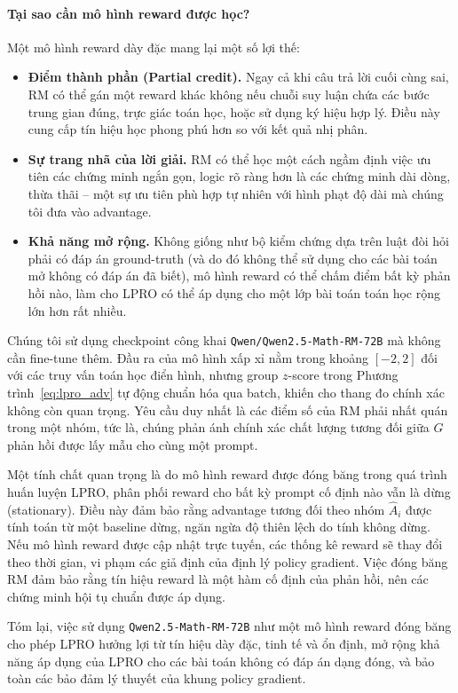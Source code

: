 \documentclass[11pt,a4paper]{article}
\begin{document}
\paragraph{Tại sao cần mô hình reward được học?}
Một mô hình reward dày đặc mang lại một số lợi thế:
\begin{itemize}[leftmargin=*]
  \item \textbf{Điểm thành phần (Partial credit).} Ngay cả khi câu trả lời cuối cùng sai, RM có thể gán một reward khác không nếu chuỗi suy luận chứa các bước trung gian đúng, trực giác toán học, hoặc sử dụng ký hiệu hợp lý. Điều này cung cấp tín hiệu học phong phú hơn so với kết quả nhị phân.
  \item \textbf{Sự trang nhã của lời giải.} RM có thể học một cách ngầm định việc ưu tiên các chứng minh ngắn gọn, logic rõ ràng hơn là các chứng minh dài dòng, thừa thãi – một sự ưu tiên phù hợp tự nhiên với hình phạt độ dài mà chúng tôi đưa vào advantage.
  \item \textbf{Khả năng mở rộng.} Không giống như bộ kiểm chứng dựa trên luật đòi hỏi phải có đáp án ground-truth (và do đó không thể sử dụng cho các bài toán mở không có đáp án đã biết), mô hình reward có thể chấm điểm bất kỳ phản hồi nào, làm cho LPRO có thể áp dụng cho một lớp bài toán toán học rộng lớn hơn rất nhiều.
\end{itemize}

Chúng tôi sử dụng checkpoint công khai \texttt{Qwen/Qwen2.5-Math-RM-72B} mà không cần fine-tune thêm. Đầu ra của mô hình xấp xỉ nằm trong khoảng $[-2, 2]$ đối với các truy vấn toán học điển hình, nhưng group $z$-score trong Phương trình~\eqref{eq:lpro_adv} tự động chuẩn hóa qua batch, khiến cho thang đo chính xác không còn quan trọng. Yêu cầu duy nhất là các điểm số của RM phải nhất quán trong một nhóm, tức là, chúng phản ánh chính xác chất lượng tương đối giữa $G$ phản hồi được lấy mẫu cho cùng một prompt.

Một tính chất quan trọng là do mô hình reward được đóng băng trong quá trình huấn luyện LPRO, phân phối reward cho bất kỳ prompt cố định nào vẫn là dừng (stationary). Điều này đảm bảo rằng advantage tương đối theo nhóm $\hat{A}_i$ được tính toán từ một baseline dừng, ngăn ngừa độ thiên lệch do tính không dừng. Nếu mô hình reward được cập nhật trực tuyến, các thống kê reward sẽ thay đổi theo thời gian, vi phạm các giả định của định lý policy gradient. Việc đóng băng RM đảm bảo rằng tín hiệu reward là một hàm cố định của phản hồi, nên các chứng minh hội tụ chuẩn được áp dụng.

Tóm lại, việc sử dụng \texttt{Qwen2.5-Math-RM-72B} như một mô hình reward đóng băng cho phép LPRO hưởng lợi từ tín hiệu dày đặc, tinh tế và ổn định, mở rộng khả năng áp dụng của LPRO cho các bài toán không có đáp án dạng đóng, và bảo toàn các bảo đảm lý thuyết của khung policy gradient.
\end{document}
